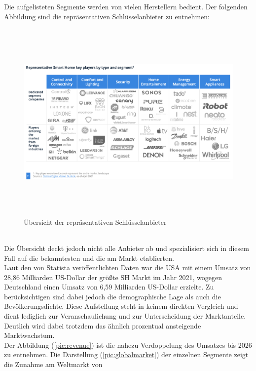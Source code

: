        \pagebreak
        Die aufgelisteten Segmente werden von vielen Herstellern bedient. Der folgenden Abbildung sind die repräsentativen Schlüsselanbieter zu entnehmen:
        \begin{figure}[hbt!]
            \centering
            \includegraphics[width=15cm,height=10cm,keepaspectratio]{images/keyplayers.png}
            \caption{Übersicht der repräsentativen Schlüsselanbieter \cite{statista2021}} 
            \label{pic:landscape}
        \end{figure}
        \\
        Die Übersicht deckt jedoch nicht alle Anbieter ab und spezialisiert sich in diesem Fall auf die bekanntesten und die am 
        Markt etablierten. 
        \\
        \linebreak
        Laut den von Statista veröffentlichten Daten war die USA mit einem Umsatz von 28,86 Milliarden US-Dollar der größte 
        \acl{SH} Markt im Jahr 2021, wogegen Deutschland einen Umsatz von 6,59 Milliarden US-Dollar erzielte. Zu berücksichtigen sind 
        dabei jedoch die demographische Lage als auch die Bevölkerungsdichte. Diese Aufstellung steht in keinem direkten Vergleich und 
        dient lediglich zur Veranschaulichung und zur Unterscheidung der Marktanteile. Deutlich wird dabei trotzdem das ähnlich prozentual ansteigende 
        Marktwachstum. 
        \\
        \linebreak
        Der Abbildung (\ref{pic:revenue}) ist die nahezu Verdoppelung des Umsatzes bis 2026 zu entnehmen. Die Darstellung 
        (\ref{pic:globalmarket}) der einzelnen Segmente zeigt die Zunahme am Weltmarkt von 
